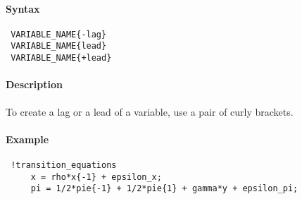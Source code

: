 


	\paragraph{Syntax}
 
 \begin{verbatim}
 VARIABLE_NAME{-lag}
 VARIABLE_NAME{lead}
 VARIABLE_NAME{+lead}
 \end{verbatim}
 
 \paragraph{Description}
 
 To create a lag or a lead of a variable, use a pair of curly brackets.
 
 \paragraph{Example}
 
 \begin{verbatim}
 !transition_equations
     x = rho*x{-1} + epsilon_x;
     pi = 1/2*pie{-1} + 1/2*pie{1} + gamma*y + epsilon_pi;
 \end{verbatim}


